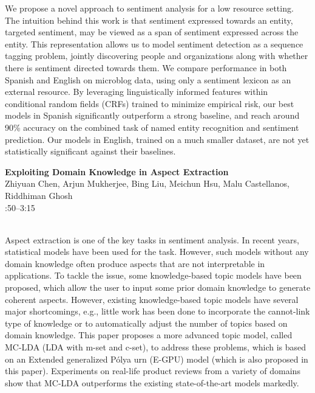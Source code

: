 \documentclass[twoside,makeidx]{book}
\renewcommand{\normalsize}{\fontsize{8}{9}\selectfont}
\renewcommand{\small}{\fontsize{7}{8}\selectfont}
\begin{document}
\nopagebreak%
\noindent%
{\small We propose a novel approach to sentiment analysis for a low resource setting. The intuition behind this work is that sentiment expressed towards an entity, targeted sentiment, may be viewed as a span of sentiment expressed across the entity. This representation allows us to model sentiment detection as a sequence tagging problem, jointly discovering people and organizations along with whether there is sentiment directed towards them. We compare performance in both Spanish and English on microblog data, using only a sentiment lexicon as an external resource. By leveraging linguistically informed features within conditional random fields (CRFs) trained to minimize empirical risk, our best models in Spanish significantly outperform a strong baseline, and reach around 90\% accuracy on the combined task of named entity recognition and sentiment prediction. Our models in English, trained on a much smaller dataset, are not yet statistically significant against their baselines.}
\par\vspace{2em}\noindent%
\begin{minipage}{\linewidth}%
\begin{center}
\textbf{\normalsize Exploiting Domain Knowledge in Aspect Extraction}\\
\normalsize  Zhiyuan Chen,  Arjun Mukherjee,  Bing Liu,  Meichun Hsu,  Malu Castellanos,  Riddhiman Ghosh\\
{\small 2:50--3:15}\\
\end{center}
\end{minipage}\\[0.5em]
\nopagebreak%
\noindent%
{\small Aspect extraction is one of the key tasks in sentiment analysis. In recent years, statistical models have been used for the task. However, such models without any domain knowledge often produce aspects that are not interpretable in applications. To tackle the issue, some knowledge-based topic models have been proposed, which allow the user to input some prior domain knowledge to generate coherent aspects. However, existing knowledge-based topic models have several major shortcomings, e.g., little work has been done to incorporate the cannot-link type of knowledge or to automatically adjust the number of topics based on domain knowledge. This paper proposes a more advanced topic model, called MC-LDA (LDA with m-set and c-set), to address these problems, which is based on an Extended generalized P\'{o}lya urn (E-GPU) model (which is also proposed in this paper).  Experiments on real-life product reviews from a variety of domains show that MC-LDA outperforms the existing state-of-the-art models markedly.}
\clearpage
\end{document}
